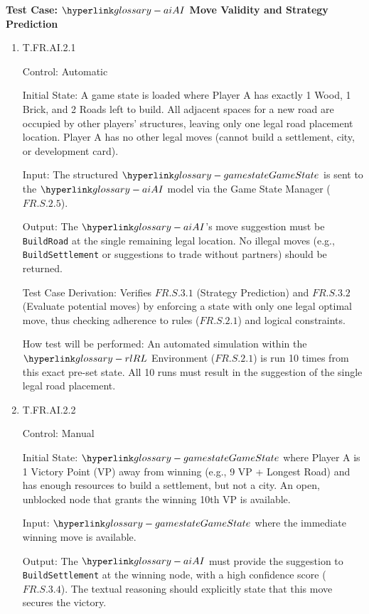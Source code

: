\documentclass[12pt, titlepage]{article}
\begin{document}
\textbf{Test Case: $\AI{}$ Move Validity and Strategy Prediction}

\begin{enumerate}

\item{T.FR.AI.2.1\\}

Control: Automatic

Initial State: A game state is loaded where Player A has exactly 1 Wood, 1 Brick, and 2 Roads left to build.
All adjacent spaces for a new road are occupied by other players' structures, leaving only one legal road placement location.
Player A has no other legal moves (cannot build a settlement, city, or development card).

Input: The structured $\GameState{}$ is sent to the $\AI{}$ model via the Game State Manager ($\hyperref[FR.S.2.5]{FR.S.2.5}$).

Output: The $\AI{}$'s move suggestion must be \texttt{BuildRoad} at the single remaining legal location.
No illegal moves (e.g., \texttt{BuildSettlement} or suggestions to trade without partners) should be returned.

Test Case Derivation: Verifies $\hyperref[FR.S.3.1]{FR.S.3.1}$ (Strategy Prediction) and $\hyperref[FR.S.3.2]{FR.S.3.2}$ (Evaluate potential moves) by enforcing a state with only one legal optimal move, thus checking adherence to rules ($\hyperref[FR.S.2.1]{FR.S.2.1}$) and logical constraints.

How test will be performed: An automated simulation within the $\RL{}$ Environment ($\hyperref[FR.S.2.1]{FR.S.2.1}$) is run 10 times from this exact pre-set state.
All 10 runs must result in the suggestion of the single legal road placement.

\item{T.FR.AI.2.2\\}

Control: Manual

Initial State: $\GameState{}$ where Player A is 1 Victory Point (VP) away from winning (e.g., 9 VP + Longest Road) and has enough resources to build a settlement, but not a city.
An open, unblocked node that grants the winning 10th VP is available.

Input: $\GameState{}$ where the immediate winning move is available.

Output: The $\AI{}$ must provide the suggestion to \texttt{BuildSettlement} at the winning node, with a high confidence score ($\hyperref[FR.S.3.4]{FR.S.3.4}$). The textual reasoning should explicitly state that this move secures the victory.


\end{enumerate}
\end{document}
